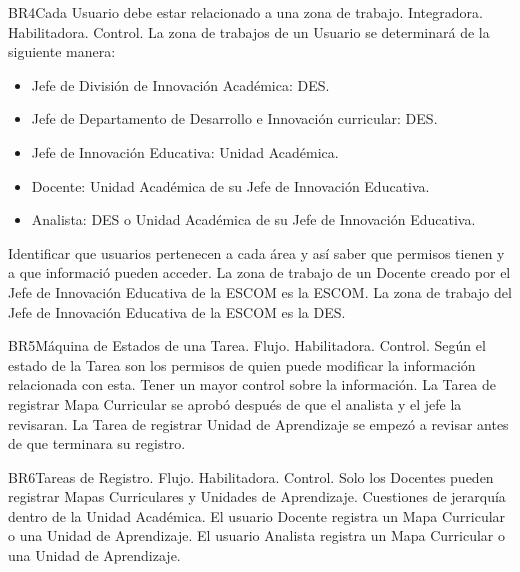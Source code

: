 \begin{BussinesRule}{BR4}{Cada Usuario debe estar relacionado a una zona de trabajo.}
    \BRitem[Tipo:] Integradora.
    \BRitem[Clase:] Habilitadora.
    \BRitem[Nivel:] Control.
    \BRitem[Descripción:] La zona de trabajos de un Usuario se determinará de la siguiente manera:
    \begin{itemize}
        \item Jefe de División de Innovación Académica: DES.
        \item Jefe de Departamento de Desarrollo e Innovación curricular: DES.
        \item Jefe de Innovación Educativa: Unidad Académica.
        \item Docente: Unidad Académica de su Jefe de Innovación Educativa.
        \item Analista:  DES o Unidad Académica de su Jefe de Innovación Educativa.
    \end{itemize}
    \BRitem[Motivación:] Identificar que usuarios pertenecen a cada área y así saber que permisos tienen y a que informació pueden acceder.
     La zona de trabajo de un Docente creado por el Jefe de Innovación Educativa de la ESCOM es la ESCOM.
     La zona de trabajo del Jefe de Innovación Educativa de la ESCOM es la DES.
\end{BussinesRule}

\begin{BussinesRule}{BR5}{Máquina de Estados de una Tarea.}
    \BRitem[Tipo:] Flujo.
    \BRitem[Clase:] Habilitadora.
    \BRitem[Nivel:] Control.
    \BRitem[Descripción:] Según el estado de la Tarea son los permisos de quien puede modificar la información relacionada con esta.
    \BRitem[Motivación:] Tener un mayor control sobre la información.
     La Tarea de registrar Mapa Curricular se aprobó después de que el analista y el jefe la revisaran.
     La Tarea de registrar Unidad de Aprendizaje se empezó a revisar antes de que terminara su registro.
\end{BussinesRule}

\begin{BussinesRule}{BR6}{Tareas de Registro.}
    \BRitem[Tipo:] Flujo.
    \BRitem[Clase:] Habilitadora.
    \BRitem[Nivel:] Control.
    \BRitem[Descripción:] Solo los Docentes pueden registrar Mapas Curriculares y Unidades de Aprendizaje.
    \BRitem[Motivación:] Cuestiones de jerarquía dentro de la Unidad Académica.
     El usuario Docente registra un Mapa Curricular o una Unidad de Aprendizaje.
     El usuario Analista registra un Mapa Curricular o una Unidad de Aprendizaje.
\end{BussinesRule}


